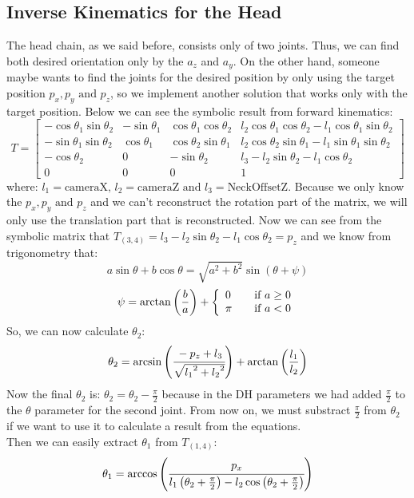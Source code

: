 \subsection{Inverse Kinematics for the Head}
The head chain, as we said before, consists only of two joints. Thus, we can find both desired orientation only by the $a_z$ and $a_y$. On the other hand, someone maybe wants to find the joints for the desired position by only using the target position $p_x,p_y\text{ and }p_z$, so we implement another solution that works only with the target position. Below we can see the symbolic result from forward kinematics:
\[
T = 
\begin{bmatrix}
-\cos\theta_1\sin\theta_2 & -\sin\theta_1 & \cos\theta_1\cos\theta_2 &  l_2\cos\theta_1\cos\theta_2 - l_1\cos\theta_1\sin\theta_2\\
-\sin\theta_1\sin\theta_2 & \cos\theta_1 & \cos\theta_2\sin\theta_1 & l_2\cos\theta_2\sin\theta_1 - l_1\sin\theta_1\sin\theta_2\\
-\cos\theta_2 & 0 & -\sin\theta_2 & l_3 - l_2\sin\theta_2 - l_1\cos\theta_2\\
0 & 0 & 0 & 1
\end{bmatrix}
\]
where: $l_1 = \text{cameraX, }l_2 = \text{cameraZ and }l_3 = \text{NeckOffsetZ}$.
Because we only know the $p_x,p_y\text{ and }p_z$ and we can't reconstruct the rotation part of the matrix, we will only use the translation part that is reconstructed. Now we can see from the symbolic matrix that $T_{(3,4)} = l_3 - l_2\sin\theta_2 - l_1\cos\theta_2 = p_z$ and we know from trigonometry that: 
\[
a\sin\theta + b\cos\theta = \sqrt{a^2+b^2}\sin\left(\theta + \psi\right)
\]
\[
\psi=\arctan\left(\frac{b}{a}\right) + \left\{ 
  \begin{array}{l l}
    0 & \quad \text{if }a\geq0\\
    \pi & \quad \text{if }a<0\\
  \end{array} \right.
\]
So, we can now calculate $\theta_2$:
\[
\theta_2 = \arcsin\left(\cfrac{-p_z+l_3}{\sqrt{{l_1}^2+{l_2}^2}}\right) + \arctan\left(\frac{l_1}{l_2}\right)
\]
Now the final $\theta_2$ is: $\theta_2 = \theta_2 - \frac{\pi}{2}$ because in the DH parameters we had added $\frac{\pi}{2}$ to the $\theta$ parameter for the second joint.  From now on, we must substract $\frac{\pi}{2}$ from $\theta_2$ if we want to use it to calculate a result from the equations.\\
Then we can easily extract $\theta_1$ from $T_{(1,4)}$:
\[
\theta_1 = \arccos\left(\cfrac{p_x}{l_1\left(\theta_2 + \frac{\pi}{2}\right) - l_2\cos\left(\theta_2 + \frac{\pi}{2}\right)}\right)
\]
